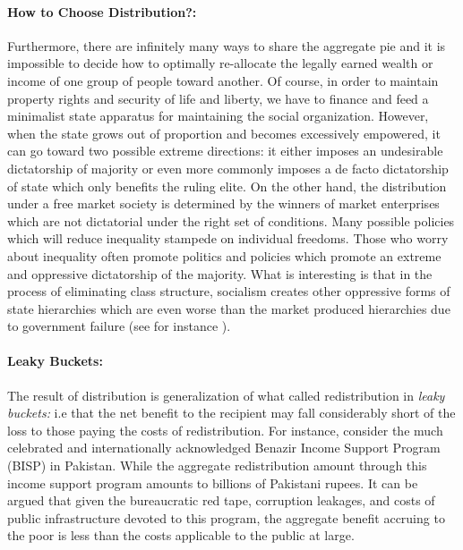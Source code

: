 \documentclass[12pt]{article}
\newcommand{\1}{\mathbbm 1}
\begin{document}
		\paragraph{How to Choose Distribution?:} Furthermore, there are infinitely many ways to share the aggregate pie and it is impossible to decide how to optimally re-allocate the legally earned wealth or income of one group of people toward another. Of course, in order to maintain property rights and security of life and liberty, we have to finance and feed a minimalist state apparatus for maintaining the social organization. However, when the state grows out of proportion and becomes excessively empowered, it can go toward two possible extreme directions: it either imposes an undesirable dictatorship of majority or even more commonly imposes a de facto dictatorship of state which only benefits the ruling elite. On the other hand, the distribution under a free market society is determined by the winners of market enterprises which are not dictatorial under the right set of conditions. Many possible policies which will reduce inequality stampede on individual freedoms. Those who worry about inequality often promote politics and policies which promote an extreme and oppressive dictatorship of the majority. What is interesting is that in the process of eliminating class structure, socialism creates other oppressive forms of state hierarchies which are even worse than the market produced hierarchies due to government failure (see for instance \cite{le1991theory}).
		
		
		
		
		
		 
		 \paragraph{Leaky Buckets:}The result of distribution is generalization of what \cite{okun1975big} called redistribution in \textit{leaky buckets:} i.e that the net benefit to the
		recipient may fall considerably short of the loss to those
		paying the costs of redistribution. For instance, consider the much celebrated and internationally acknowledged Benazir Income Support Program (BISP) in Pakistan. While the aggregate redistribution amount through this income support program amounts to billions of Pakistani rupees. It can be argued that given the bureaucratic red tape, corruption leakages, and costs of public infrastructure devoted to this program, the aggregate benefit accruing to the poor is less than the costs applicable to the public at large.  
		
\end{document}
